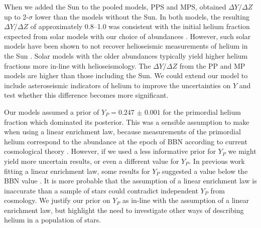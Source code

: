 When we added the Sun to the pooled models, PPS and MPS, obtained $\Delta Y / \Delta Z$ up to 2-$\sigma$ lower than the models without the Sun. In both models, the resulting $\Delta Y / \Delta Z$ of approximately \numrange{0.8}{1.0} was consistent with the initial helium fraction expected from solar models with our choice of \citet{Asplund.Grevesse.ea2009} abundances \citep{Serenelli.Basu2010}. However, such solar models have been shown to not recover helioseismic measurements of helium in the Sun \citep{Basu.Antia2004, Serenelli.Basu.ea2009, Villante.Serenelli.ea2014}. Solar models with the older \citet{Grevesse.Sauval1998} abundances typically yield higher helium fractions more in-line with helioseismology. The $\Delta Y / \Delta Z$ from the PP and MP models are higher than those including the Sun. We could extend our model to include asteroseismic indicators of helium to improve the uncertainties on $Y$ and test whether this difference becomes more significant.


Our models assumed a prior of $Y_P = \num{0.247(1)}$ for the primordial helium fraction which dominated its posterior. This was a sensible assumption to make when using a linear enrichment law, because measurements of the primordial helium correspond to the abundance at the epoch of BBN according to current cosmological theory \citep{Cyburt.Fields.ea2016}. However, if we used a less informative prior for $Y_P$ we might yield more uncertain results, or even a different value for $Y_P$. In previous work fitting a linear enrichment law, some results for $Y_P$ suggested a value below the BBN value \citep{Casagrande.Flynn.ea2007, SilvaAguirre.Lund.ea2017}. It is more probable that the assumption of a linear enrichment law is inaccurate than a sample of stars could contradict independent $Y_P$ from cosmology. We justify our prior on $Y_P$ as in-line with the assumption of a linear enrichment law, but highlight the need to investigate other ways of describing helium in a population of stars.

